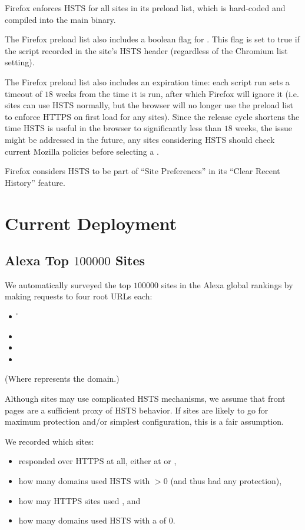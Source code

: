 \documentclass{acm_proc_article-sp}
\begin{document}
{Firefox enforces HSTS for all sites in its preload list, which is hard-coded and compiled into the main binary.

The Firefox preload list also includes a boolean flag for \iSD. This flag is set to true if the script recorded {\iSD} in the site's HSTS header (regardless of the Chromium list setting).

The Firefox preload list also includes an expiration time: each script run sets a timeout of $18$ weeks from the time it is run, after which Firefox will ignore it (i.e. sites can use HSTS normally, but the browser will no longer use the preload list to enforce HTTPS on first load for any sites)\cite{firefox-cron-expiration}. Since the release cycle shortens the time HSTS is useful in the browser to significantly less than $18$ weeks, the issue might be addressed in the future, any sites considering HSTS should check current Mozilla policies before selecting a {\ma}.

Firefox considers HSTS to be part of ``Site Preferences'' in its ``Clear Recent History'' feature.

\section{Current Deployment}
\firstsubsectionskip
\subsection{Alexa Top $100000$ Sites}

We automatically surveyed the top $100000$ sites in the Alexa global rankings\cite{alexa} by making  requests to four root URLs each:

\begin{itemize}
\item {\h}
\item {\hw}
\item {\s}
\item {\sw}
\end{itemize}

(Where {\site{\genericsite}} represents the domain.)

Although sites may use complicated HSTS mechanisms, we assume that front pages are a sufficient proxy of HSTS behavior. If sites are likely to go for maximum protection and/or simplest configuration, this is a fair assumption.

We recorded which sites:

\begin{itemize}
\item responded over HTTPS at all, either at {\s} or {\sw},
\item how many domains used HSTS with {\ma}$>0$ (and thus had any protection),
\item how may HTTPS sites used {\iSD}, and
\item how many domains used HSTS with a {\ma} of $0$.
\end{itemize}

}
\end{document}
